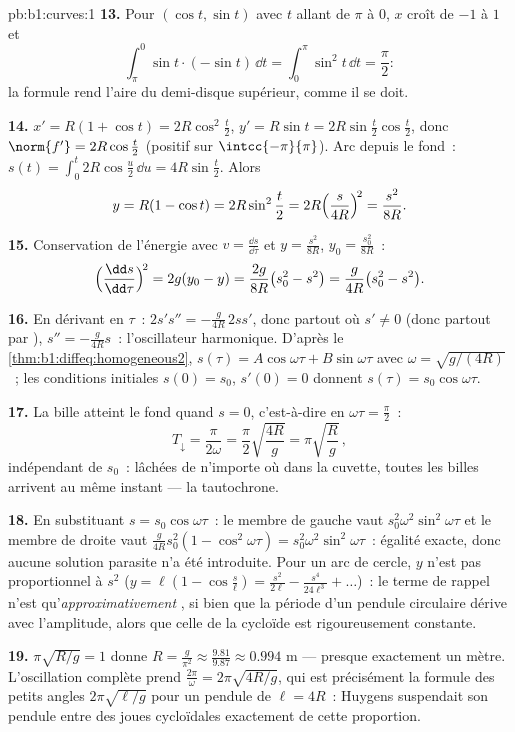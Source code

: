 \begin{solution}{pb:b1:curves:1}
\textbf{13.} Pour $(\cos t, \sin t)$ avec $t$ allant de $\pi$ à $0$,
$x$ croît de $-1$ à $1$ et
\[
\int_\pi^0 \sin t\cdot(-\sin t)\,\dd t
= \int_0^\pi \sin^2 t\,\dd t = \frac\pi2 :
\]
la formule rend l'aire du demi-disque supérieur, comme il se doit.

\textbf{14.} $x' = R(1 + \cos t) = 2R\cos^2\frac t2$, $y' =
R\sin t = 2R\sin\frac t2\cos\frac t2$, donc $\norm{f'} =
2R\cos\frac t2$ (positif sur $\intcc{-\pi}{\pi}$). Arc depuis
le fond~: $s(t) = \int_0^t 2R\cos\frac u2\,\dd u =
4R\sin\frac t2$. Alors
\[
y = R(1 - \cos t) = 2R\sin^2\frac t2
= 2R\Bigl(\frac{s}{4R}\Bigr)^{\!2} = \frac{s^2}{8R} .
\]

\textbf{15.} Conservation de l'énergie avec $v = \frac{\dd s}{\dd\tau}$
et $y = \frac{s^2}{8R}$, $y_0 = \frac{s_0^2}{8R}$~:
\[
\Bigl(\frac{\dd s}{\dd\tau}\Bigr)^{\!2} = 2g(y_0 - y)
= \frac{2g}{8R}\bigl(s_0^2 - s^2\bigr)
= \frac{g}{4R}\bigl(s_0^2 - s^2\bigr).
\]

\textbf{16.} En dérivant en $\tau$~: $2s's'' =
-\frac{g}{4R}\,2ss'$, donc partout où $s' \neq 0$ (donc partout
par ), $s'' = -\frac{g}{4R}s$~: l'oscillateur harmonique.
D'après le \cref{thm:b1:diffeq:homogeneous2}, $s(\tau) =
A\cos\omega\tau + B\sin\omega\tau$ avec $\omega =
\sqrt{g/(4R)}$~; les conditions initiales $s(0) = s_0$, $s'(0) = 0$
donnent $s(\tau) = s_0\cos\omega\tau$.

\textbf{17.} La bille atteint le fond quand $s = 0$, c'est-à-dire en
$\omega\tau = \frac\pi2$~:
\[
T_{\downarrow} = \frac{\pi}{2\omega}
= \frac\pi2\sqrt{\frac{4R}{g}} = \pi\sqrt{\frac Rg}\,,
\]
indépendant de $s_0$~: lâchées de n'importe où dans la cuvette, toutes
les billes arrivent au même instant --- la tautochrone.

\textbf{18.} En substituant $s = s_0\cos\omega\tau$~: le membre de gauche
vaut $s_0^2\omega^2\sin^2\omega\tau$ et le membre de droite vaut
$\frac{g}{4R}s_0^2(1 - \cos^2\omega\tau) =
s_0^2\omega^2\sin^2\omega\tau$~: égalité exacte, donc aucune
solution parasite n'a été introduite. Pour un arc de cercle, $y$ n'est pas
proportionnel à $s^2$ ($y = \ell(1 - \cos\frac s\ell) =
\frac{s^2}{2\ell} - \frac{s^4}{24\ell^3} + \dots$)~: le
terme de rappel n'est qu'\emph{approximativement} , si bien que la
période d'un pendule circulaire dérive avec l'amplitude, alors que celle de la
cycloïde est rigoureusement constante.

\textbf{19.} $\pi\sqrt{R/g} = 1$ donne $R = \frac{g}{\pi^2}
\approx \frac{9.81}{9.87} \approx 0.994$ m --- presque exactement
un mètre. L'oscillation complète prend $\frac{2\pi}\omega =
2\pi\sqrt{4R/g}$, qui est précisément la formule des petits angles
$2\pi\sqrt{\ell/g}$ pour un pendule de  $\ell = 4R$~:
Huygens suspendait son pendule entre des joues cycloïdales exactement
de cette proportion.


\end{solution}
